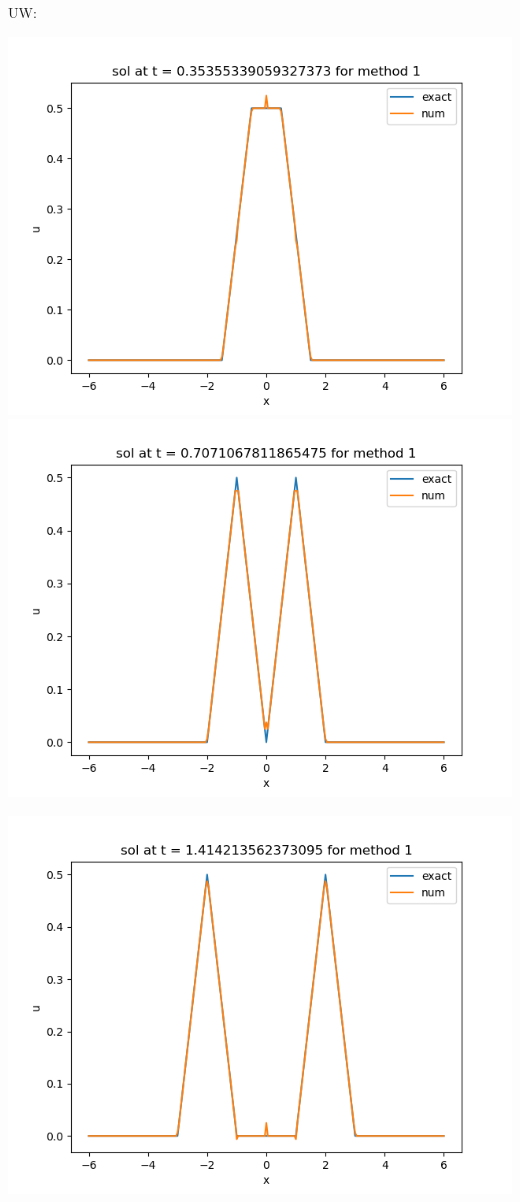 \documentclass{article}
\begin{document}
\begin{enumerate}
\begin{enumerate}
	UW:
	\begin{center}
		\includegraphics[scale=.32]{hw11 sol n = 10 method 1}
		\includegraphics[scale=.32]{hw11 sol n = 20 method 1}
	\end{center}
	\begin{center}
		\includegraphics[scale=.32]{hw11 sol n = 40 method 1}

\end{center}
\end{enumerate}
\end{enumerate}
\end{document}
